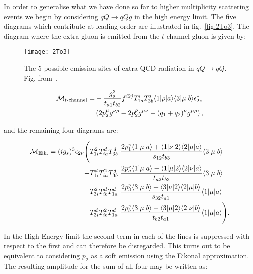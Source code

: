 	In order to generalise what we have done so far to higher multiplicity scattering events we begin
	by considering $qQ\rightarrow qQg$ in the high energy limit.  The five diagrams which contribute at
	leading order are illustrated in fig.~\eqref{fig:2To3}.  The diagram
	where the extra gluon is emitted from the $t$-channel gluon is given by:

	\begin{figure}[t]
		\begin{center}
		\texttt{[image: 2To3]}
		\caption{The 5 possible emission sites of extra QCD radiation in $qQ\rightarrow qQ$.
		Fig. from~\cite{Andersen:2009nu}.}
		\label{fig:2To3}
		\end{center}
	\end{figure}

	\begin{align}
	\begin{split}
		\mathcal{M}_{t\text{-channel}} = &-\frac{g_s^3}{t_{a1}t_{b2}}f^{i2j}T^i_{1a}T^j_{3b}\langle 1 | \rho | a \rangle\langle 3 | \mu | b \rangle
		\epsilon^*_{2\nu}\\&\left(2p_2^\mu g^{\nu\rho} - 2p_2^\rho g^{\mu\nu} - (q_1 + q_2)^\nu g^{\mu\rho} \right),
		\label{eqn:mtchannel}
	\end{split}
	\end{align}

	and the remaining four diagrams are:

	\begin{align}
	\begin{split}
	    \mathcal{M}_{\text{Eik.}} = (ig_s)^3 \epsilon_{2\nu} \Bigg(
	     &T^2_{1i}T^d_{ia}T^d_{3b}\ \frac{2p_1^\nu\langle 1 | \mu | a \rangle + \langle 1 | \nu | 2 \rangle\langle 2 | \mu | a \rangle} {s_{12}t_{b3}} \langle 3 | \mu | b \rangle \\
	    +&T^d_{1i}T^2_{ia}T^d_{3b}\ \frac{2p_a^\nu\langle 1 | \mu | a \rangle - \langle 1 | \mu | 2 \rangle\langle 2 | \nu | a \rangle} {t_{a2}t_{b3}} \langle 3 | \mu | b \rangle \\
	    +&T^2_{3i}T^d_{ib}T^d_{1a}\ \frac{2p_3^\nu\langle 3 | \mu | b \rangle + \langle 3 | \nu | 2 \rangle\langle 2 | \mu | b \rangle} {s_{32}t_{a1}} \langle 1 | \mu | a \rangle\\
	    +&T^d_{3i}T^2_{ib}T^d_{1a}\ \frac{2p_b^\nu\langle 3 | \mu | b \rangle - \langle 3 | \mu | 2 \rangle\langle 2 | \nu | b \rangle} {t_{b2}t_{a1}} \langle 1 | \mu | a \rangle\Bigg).
		\label{eq:fulltree}
	\end{split}
	\end{align}

	In the High Energy limit the second term in each of the lines is suppressed with respect to the
	first and can therefore be disregarded.  This turns out to be equivalent to considering
	$p_2$ as a soft emission using the Eikonal approximation.  The resulting amplitude for the sum
	of all four may be written as:

